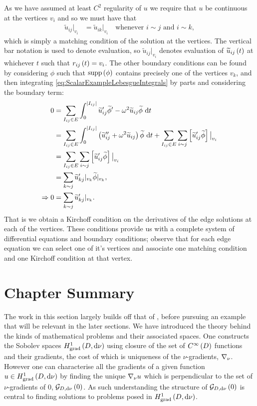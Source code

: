 As we have assumed at least $C^2$ regularity of $u$ we require that $u$ be continuous at the vertices $v_i$ and so we must have that
\begin{align*}
	\widetilde{u}_{ij}\vert_{v_i} &= \widetilde{u}_{ik}\vert_{v_i} \quad \text{whenever } i\sim j \text{ and } i\sim k,
\end{align*}
which is simply a matching condition of the solution at the vertices.
The vertical bar notation is used to denote evaluation, so $\widetilde{u}_{ij}\vert_{v_i}$ denotes evaluation of $\widetilde{u}_{ij}\left( t \right)$ at whichever $t$ such that $r_{ij}\left( t \right) = v_i$. 
The other boundary conditions can be found by considering $\phi$ such that $\mathrm{supp}\left( \phi \right)$ contains precisely one of the vertices $v_k$, and then integrating \eqref{eq:ScalarExampleLebesgueIntegrals} by parts and considering the boundary term:
\begin{align*}
	0 &= \sum_{I_{ij}\in E}\int_0^{\lvert I_{ij} \rvert}\widetilde{u}'_{ij}\widetilde{\phi}' - \omega^2\widetilde{u}_{ij}\widetilde{\phi} \ \mathrm{d} t \\
	&= \sum_{I_{ij}\in E}\int_0^{\lvert I_{ij} \rvert} \left( \widetilde{u}''_{ij} + \omega^2\widetilde{u}_{ij} \right)\widetilde{\phi} \ \mathrm{d} t + \sum_{I_{ij}\in E}\sum_{i\sim j}\left[ \widetilde{u}'_{ij}\widetilde{\phi} \right]\big\vert_{v_i} \\
	&= \sum_{I_{ij}\in E}\sum_{i\sim j}\left[ \widetilde{u}'_{ij}\widetilde{\phi} \right]\big\vert_{v_i} \\
	&= \sum_{k\sim j}\widetilde{u}'_{kj}\vert_{v_k}\widetilde{\phi}\vert_{v_k}, \\
	\Rightarrow 0 &= \sum_{k\sim j}\widetilde{u}'_{kj}\vert_{v_k}.
\end{align*}
That is we obtain a Kirchoff condition on the derivatives of the edge solutions at each of the vertices.
These conditions provide us with a complete system of differential equations and boundary conditions; observe that for each edge equation we can select one of it's vertices and associate one matching condition and one Kirchoff condition at that vertex.

\section{Chapter Summary}
The work in this section largely builds off that of , before pursuing an example that will be relevant in the later sections.
We have introduced the theory behind the kinds of mathematical problems and their associated spaces.
One constructs the Sobolev spaces $H^1_\mathrm{grad}\left( D, \mathrm{d}\nu \right)$ using closure of the set of $C^{\infty}\left( D \right)$ functions and their gradients, the cost of which is uniqueness of the $\nu$-gradients, $\nabla_\nu$.
However one can characterise all the gradients of a given function $u\in H^1_\mathrm{grad}\left( D, \mathrm{d}\nu \right)$ by finding the unique $\nabla_\nu u$ which is perpendicular to the set of $\nu$-gradients of 0, $\mathcal{G}_{ D, \mathrm{d}\nu}\left( 0 \right)$.
As such understanding the structure of $\mathcal{G}_{ D, \mathrm{d}\nu}\left( 0 \right)$ is central to finding solutions to problems posed in $H^1_\mathrm{grad}\left( D, \mathrm{d}\nu \right)$. \newline

